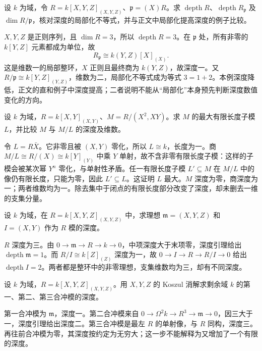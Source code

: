\begin{exercise}\label{b3:ex:16-local-depth-not-monotone}
	设 \(k\) 为域，令 \(R=k[X,Y,Z]_{(X,Y,Z)}\)、\(\mathfrak p=(X)R\)。求 \(\operatorname{depth}R\)、\(\operatorname{depth}R_{\mathfrak p}\) 及 \(\dim R/\mathfrak p\)，核对深度的局部化不等式，并与正文中局部化提高深度的例子比较。
\end{exercise}
\begin{solution}
	\(X,Y,Z\) 是正则序列，且 \(\dim R=3\)，所以 \(\operatorname{depth}R=3\)。在 \(\mathfrak p\) 处，所有非零的 \(k[Y,Z]\) 元素都成为单位，故
	\[
		R_{\mathfrak p}\cong k(Y,Z)[X]_{(X)}.
	\]
	这是维数一的局部整环，\(X\) 正则且最终商为 \(k(Y,Z)\)，故深度一。又 \(R/\mathfrak p\cong k[Y,Z]_{(Y,Z)}\)，维数为二，局部化不等式成为等式 \(3=1+2\)。本例深度降低，正文的直和例子中深度提高；二者说明不能从“局部化”本身预先判断深度数值变化的方向。
\end{solution}

\begin{exercise}\label{b3:ex:16-finite-length-submodule}
	设 \(k\) 为域，\(R=k[X,Y]_{(X,Y)}\)、\(M=R/(X^2,XY)\)。求 \(M\) 的最大有限长度子模 \(L\)，并比较 \(M\) 与 \(M/L\) 的深度及维数。
\end{exercise}
\begin{solution}
	令 \(L=R\bar X\)。它非零且被 \((X,Y)\) 零化，所以 \(L\cong k\)，长度为一。商 \(M/L\cong R/(X)\cong k[Y]_{(Y)}\) 中乘 \(Y\) 单射，故不含非零有限长度子模：这样的子模会被某次幂 \(Y^n\) 零化，与单射性矛盾。任一有限长度子模 \(L'\subseteq M\) 在 \(M/L\) 中的像仍有限长度，只能为零，因此 \(L'\subseteq L\)。这证明 \(L\) 最大。\(M\) 深度为零，商深度为一；两者维数均为一。除去集中于闭点的有限长度部分改变了深度，却未删去一维的支集分量。
\end{solution}

\begin{exercise}\label{b3:ex:16-ideal-depth}
	设 \(k\) 为域，在 \(R=k[X,Y,Z]_{(X,Y,Z)}\) 中，求理想 \(\mathfrak m=(X,Y,Z)\) 和 \(I=(X,Y)\) 作为 \(R\) 模的深度。
\end{exercise}
\begin{solution}
	\(R\) 深度为三。由 \(0\rightarrow\mathfrak m\rightarrow R\rightarrow k\rightarrow0\)，中项深度大于末项零，深度引理给出 \(\operatorname{depth}\mathfrak m=1\)。而 \(R/I\cong k[Z]_{(Z)}\) 深度为一，故 \(0\rightarrow I\rightarrow R\rightarrow R/I\rightarrow0\) 给出 \(\operatorname{depth}I=2\)。两者都是整环中的非零理想，支集维数均为三，却有不同深度。
\end{solution}

\begin{exercise}\label{b3:ex:16-three-syzygies}
	设 \(k\) 为域，\(R=k[X,Y,Z]_{(X,Y,Z)}\)。用 \(X,Y,Z\) 的 Koszul 消解求剩余域 \(k\) 的第一、第二、第三合冲模的深度。
\end{exercise}
\begin{solution}
	第一合冲模为 \(\mathfrak m\)，深度一。第二合冲模来自 \(0\rightarrow\Omega^2k\rightarrow R^3\rightarrow\mathfrak m\rightarrow0\)，因三大于一，深度引理给出深度二。第三合冲模是最左 \(R\) 的单射像，与 \(R\) 同构，深度三。再往前合冲模为零，其深度按约定为无穷大；这一步不能解释为又增加了一个有限的深度。
\end{solution}

